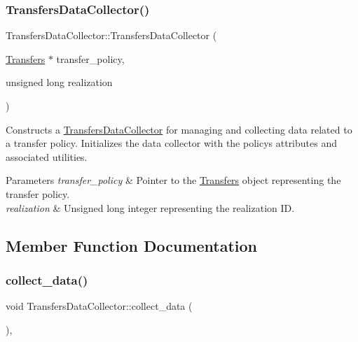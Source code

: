 \subsubsection{\texorpdfstring{Transfers\+Data\+Collector()}{TransfersDataCollector()}}
{\footnotesize\ttfamily Transfers\+Data\+Collector\+::\+Transfers\+Data\+Collector (\begin{DoxyParamCaption}\item[{\mbox{\hyperlink{classTransfers}{Transfers}} $\ast$}]{transfer\+\_\+policy,  }\item[{unsigned long}]{realization }\end{DoxyParamCaption})}



Constructs a {\ttfamily \mbox{\hyperlink{classTransfersDataCollector}{Transfers\+Data\+Collector}}} for managing and collecting data related to a transfer policy. Initializes the data collector with the policy\textquotesingle{}s attributes and associated utilities. 


\begin{DoxyParams}{Parameters}
{\em transfer\+\_\+policy} & Pointer to the {\ttfamily \mbox{\hyperlink{classTransfers}{Transfers}}} object representing the transfer policy. \\
\hline
{\em realization} & Unsigned long integer representing the realization ID. \\
\hline
\end{DoxyParams}


\subsection{Member Function Documentation}
\mbox{\label{classTransfersDataCollector_a2f5c4427699aab547ea0d3b74993752b}} 
\subsubsection{\texorpdfstring{collect\+\_\+data()}{collect\_data()}}
{\footnotesize\ttfamily void Transfers\+Data\+Collector\+::collect\+\_\+data (\begin{DoxyParamCaption}{ }\end{DoxyParamCaption})\hspace{0.3cm}{\ttfamily [override]}, {\ttfamily [virtual]}}



